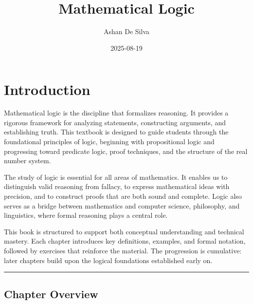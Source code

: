 \documentclass[
]{book}
\title{Mathematical Logic}
\author{Ashan De Silva}
\date{2025-08-19}
\theoremstyle{definition}
\theoremstyle{definition}
\theoremstyle{definition}
\theoremstyle{definition}
\theoremstyle{remark}
\begin{document}
\maketitle

{
\setcounter{tocdepth}{1}
\tableofcontents
}
\chapter{Introduction}\label{introduction}

Mathematical logic is the discipline that formalizes reasoning. It provides a rigorous framework for analyzing statements, constructing arguments, and establishing truth. This textbook is designed to guide students through the foundational principles of logic, beginning with propositional logic and progressing toward predicate logic, proof techniques, and the structure of the real number system.

The study of logic is essential for all areas of mathematics. It enables us to distinguish valid reasoning from fallacy, to express mathematical ideas with precision, and to construct proofs that are both sound and complete. Logic also serves as a bridge between mathematics and computer science, philosophy, and linguistics, where formal reasoning plays a central role.

This book is structured to support both conceptual understanding and technical mastery. Each chapter introduces key definitions, examples, and formal notation, followed by exercises that reinforce the material. The progression is cumulative: later chapters build upon the logical foundations established early on.

\begin{center}\rule{0.5\linewidth}{0.5pt}\end{center}

\section{Chapter Overview}\label{chapter-overview}
\end{document}
